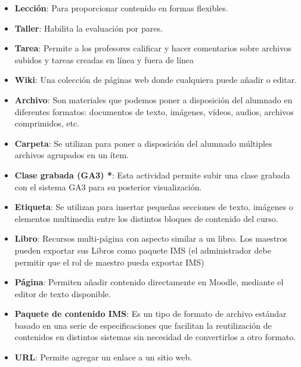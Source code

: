 \begin{enumerate}
\begin{itemize}
            \item \textbf{Lección}: Para proporcionar contenido en formas flexibles.

            \item \textbf{Taller}: Habilita la evaluación por pares.

            \item \textbf{Tarea}: Permite a los profesores calificar y hacer comentarios sobre archivos subidos y tareas creadas en línea y fuera de línea

            \item \textbf{Wiki}: Una colección de páginas web donde cualquiera puede añadir o editar.

            \item \textbf{Archivo}: Son materiales que podemos poner a disposición del alumnado en diferentes formatos: documentos de texto, imágenes, vídeos, audios, archivos comprimidos, etc.

            \item \textbf{Carpeta}: Se utilizan para poner a disposición del alumnado múltiples archivos agrupados en un ítem.

            \item \textbf{Clase grabada (GA3) *}: Esta actividad permite subir una clase grabada con el sistema GA3 para su posterior visualización.

            \item \textbf{Etiqueta}: Se utilizan para insertar pequeñas secciones de texto, imágenes o elementos multimedia entre los distintos bloques de contenido del curso.

            \item \textbf{Libro}: Recursos multi-página con aspecto similar a un libro. Los maestros pueden exportar sus Libros como paquete IMS (el administrador debe permitir que el rol de maestro pueda exportar IMS)

            \item \textbf{Página}: Permiten añadir contenido directamente en Moodle, mediante el editor de texto disponible.

            \item \textbf{Paquete de contenido IMS}: Es un tipo de formato de archivo estándar basado en una serie de especificaciones que facilitan la reutilización de contenidos en distintos sistemas sin necesidad de convertirlos a otro formato.

            \item \textbf{URL}: Permite agregar un enlace a un sitio web.


\end{itemize}
\end{enumerate}
